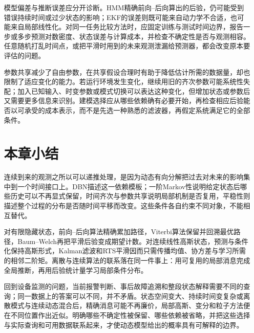 模型偏差与推断误差应分开诊断。HMM精确前向--后向算出的后验，仍可能受到错误持续时间或过少状态的影响；EKF的误差则既可能来自动力学不合适，也可能来自局部线性化。对同一任务比较方法时，应固定训练与测试时间边界，报告一步或多步预测对数密度、状态误差与计算成本，并检查不确定性是否与观测相容。任意随机打乱时间点，或把平滑时用到的未来观测泄漏给预测器，都会改变原本要评估的问题。

参数共享减少了自由参数，在共享假设合理时有助于降低估计所需的数据量，却也限制了适应变化的能力。若运行环境发生变化，继续用旧的齐次参数可能系统性失配；加入已知输入、时变参数或模式切换可以表达这种变化，但增加状态或参数后又需要更多信息来识别。建模选择应从哪些依赖确有必要开始，再检查相应后验能否以可承受的成本表示，而不是先选一种熟悉的滤波器，再假定系统满足它的全部条件。

\section{本章小结}
\label{sec:pgm-dynamic-summary}

连续到来的观测之所以可以递推处理，是因为动态有向分解把过去对未来的影响集中到一个时间接口上。DBN描述这一依赖模板；一阶Markov性说明给定状态后哪些历史可以不再显式保留，时间齐次与参数共享说明局部机制是否复用，平稳性则描述整个过程的分布是否随时间平移而改变。这些条件各自约束不同对象，不能相互替代。

对有限隐藏状态，前向--后向算法精确累加路径，Viterbi算法保留并回溯最优路径，Baum--Welch再把平滑后验变成期望计数。对连续线性高斯状态，预测与条件化保持高斯形式，Kalman滤波和RTS平滑因而只需传播均值、协方差与学习所需的相邻二阶矩。离散与连续算法的联系落在同一件事上：用可复用的局部消息完成全局推断，再用后验统计量学习局部条件分布。

回到设备监测的问题，当前报警判断、事后故障追溯和整段状态解释需要不同的查询；同一数据上的答案可以不同，并不矛盾。状态空间变大、持续时间变复杂或离散模式与连续动态混合后，精确消息可能不再廉价，局部高斯、变分和粒子方法便在不同位置作出近似。明确哪些不确定性被保留、哪些依赖被省略，并把这些选择与实际查询和可用数据联系起来，才使动态模型给出的概率具有可解释的边界。
